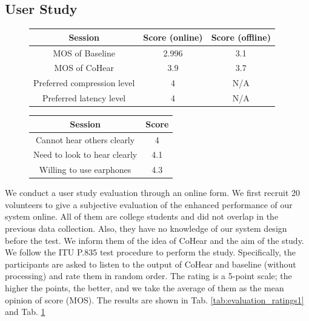 \subsection{User Study}
\begin{figure}
    \centering
    \begin{minipage}{0.6\linewidth}
        \centering
         \vspace{-1em}
        \begin{tabular}{|c|c|c|}
            \hline
            \textbf{Session} &  \textbf{Score (online)}  & \textbf{Score (offline)}  \\
            \hline
            MOS of Baseline & 2.996 & 3.1 \\
            \hline
            MOS of CoHear & 3.9 & 3.7\\
            \hline
            Preferred compression level & 4 & N/A \\
            \hline
            Preferred latency level & 4 & N/A \\
            \hline
        \end{tabular}
        \label{tab:evaluation_ratings1}
    \end{minipage}%
    \hfill
    \begin{minipage}{0.35\linewidth}
        \centering
         \vspace{-1em}
        \begin{tabular}{|c|c|}
            \hline
            \textbf{Session} & \textbf{Score} \\
            \hline
            Cannot hear others clearly & 4 \\
            \hline
            Need to look to hear clearly & 4.1  \\
            \hline
            Willing to use earphones & 4.3 \\
            \hline
        \end{tabular}
        \label{tab:evaluation_ratings2}
    \end{minipage}
    \vspace{-1em}
\end{figure}

We conduct a user study evaluation through an online form. We first recruit 20 volunteers to give a subjective evaluation of the enhanced performance of our system online. All of them are college students and did not overlap in the previous data collection. Also, they have no knowledge of our system design before the test. We inform them of the idea of CoHear and the aim of the study. 
We follow the ITU P.835 test procedure \cite{gunawan2006subjective} to perform the study. Specifically, the participants are asked to listen to the output of CoHear and baseline (without processing) and rate them in random order. The rating is a 5-point scale; the higher the points, the better, and we take the average of them as the mean opinion of score (MOS). The results are shown in Tab. \ref{tab:evaluation_ratings1} and Tab. \ref{tab:evaluation_ratings2}

